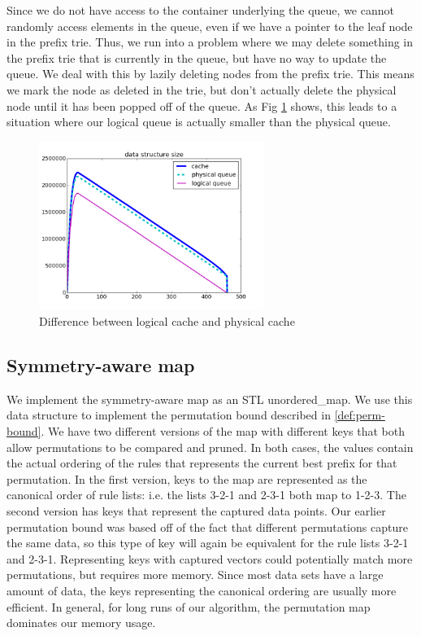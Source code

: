 \documentclass[]{article}
\theoremstyle{definition}
\begin{document}
Since we do not have access to the container underlying the queue, we cannot randomly access elements in the queue, even if we have a pointer to the leaf node in the prefix trie.
Thus, we run into a problem where we may delete something in the prefix trie that is currently in the queue, but have no way to update the queue.
We deal with this by lazily deleting nodes from the prefix trie.
This means we mark the node as deleted in the trie, but don't actually delete the physical node until it has been popped off of the queue.
As Fig \ref{fig:queue_gc} shows, this leads to a situation where our logical queue is actually smaller than the physical queue.

\begin{figure}[t!]
\begin{center}
\includegraphics[width=0.65\textwidth]{figs/ela_compas-queue-cache-size-insertions.png}
\end{center}
\caption{Difference between logical cache and physical cache}
\label{fig:queue_gc}
\end{figure}

\subsection{Symmetry-aware map}
We implement the symmetry-aware map as an STL unordered\_map. 
We use this data structure to implement the permutation bound described in \ref{def:perm-bound}.
We have two different versions of the map with different keys that both allow permutations to be compared and pruned.
In both cases, the values contain the actual ordering of the rules that represents the current best prefix for that permutation.
In the first version, keys to the map are represented as the canonical order of rule lists: i.e. the lists 3-2-1 and 2-3-1 both map to 1-2-3.
The second version has keys that represent the captured data points.
Our earlier permutation bound was based off of the fact that different permutations capture the same data, so this type of key will again be equivalent for the rule lists 3-2-1 and 2-3-1.
Representing keys with captured vectors could potentially match more permutations, but requires more memory.
Since most data sets have a large amount of data, the keys representing the canonical ordering are usually more efficient.
In general, for long runs of our algorithm, the permutation map dominates our memory usage.
\end{document}
